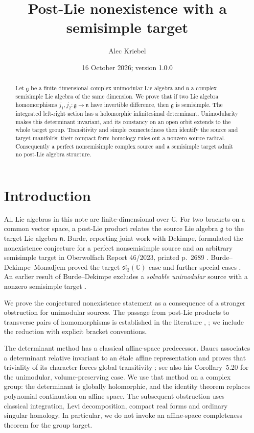 \documentclass[11pt]{amsart}
\title{Post-Lie nonexistence with a semisimple target}
\author{Alec Kriebel}
\date{16 October 2026; version 1.0.0}
\theoremstyle{remark}
\newcommand{\g}{\mathfrak g}
\newcommand{\n}{\mathfrak n}
\newcommand{\C}{\mathbb C}
\begin{document}
\begin{abstract}
Let \(\g\) be a finite-dimensional complex unimodular Lie algebra and
\(\n\) a complex semisimple Lie algebra of the same dimension.
We prove that if two Lie algebra homomorphisms
\(j_1,j_2:\g\to\n\) have invertible difference, then \(\g\) is
semisimple.  The integrated left-right action has a holomorphic
infinitesimal determinant.  Unimodularity makes this determinant
invariant, and its constancy on an open orbit extends to the whole
target group.  Transitivity and simple connectedness then identify the
source and target manifolds; their compact-form homology rules out a
nonzero source radical.  Consequently a perfect nonsemisimple complex
source and a semisimple target admit no post-Lie algebra structure.
\end{abstract}
\maketitle

\section{Introduction}

All Lie algebras in this note are finite-dimensional over \(\C\).
For two brackets on a common vector space, a post-Lie product relates
the source Lie algebra \(\g\) to the target Lie algebra \(\n\).
Burde, reporting joint work with Dekimpe, formulated the nonexistence
conjecture for a perfect nonsemisimple source and an arbitrary semisimple
target in Oberwolfach Report 46/2023, printed p.~2689
\cite{OWR}.  Burde--Dekimpe--Monadjem proved the target
\(\mathfrak{sl}_3(\C)\) case and further special cases
\cite[Theorem~3.10 and Propositions~3.11--3.12]{BDM}.
An earlier result of Burde--Dekimpe excludes a \emph{solvable
unimodular} source with a nonzero semisimple target
\cite[Theorem~3.3]{BD}.

We prove the conjectured nonexistence statement as a consequence of a
stronger obstruction for unimodular sources.  The passage from post-Lie
products to transverse pairs of homomorphisms is established in the
literature \cite[Proposition~2.16]{BDV},
\cite[Proposition~2.6]{BDM}; we include the reduction with explicit
bracket conventions.

The determinant method has a classical affine-space predecessor.
Baues associates a determinant relative invariant to an
\'etale affine representation and proves that triviality of its
character forces global transitivity
\cite[\S5.4.1, equation~(5.3), and Theorem~5.19]{Baues};
see also his Corollary~5.20 for the unimodular, volume-preserving case.
We use that method on a complex group: the determinant is globally
holomorphic, and the identity theorem replaces polynomial continuation
on affine space.  The subsequent obstruction uses classical
integration, Levi decomposition, compact real forms and ordinary
singular homology.  In particular, we do not invoke an affine-space
completeness theorem for the group target.
\end{document}
